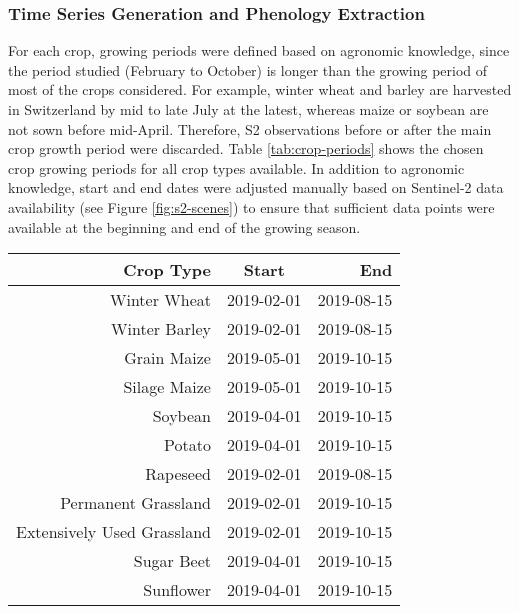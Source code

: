 \subsubsection{Time Series Generation and Phenology Extraction}
\label{subsubsec:time-series}

For each crop, growing periods were defined based on agronomic knowledge, since the period studied (February to October) is longer than the growing period of most of the crops considered. For example, winter wheat and barley are harvested in Switzerland by mid to late July at the latest, whereas maize or soybean are not sown before mid-April. Therefore, \gls{S2} observations before or after the main crop growth period were discarded. Table \ref{tab:crop-periods} shows the chosen crop growing periods for all crop types available. In addition to agronomic knowledge, start and end dates were adjusted manually based on Sentinel-2 data availability (see Figure \ref{fig:s2-scenes}) to ensure that sufficient data points were available at the beginning and end of the growing season.

\begin{table*}
\centering
\caption{Key crop growth periods defined based on agronomic knowledge to constrain the temporal range considered per crop type between a start and end date (YYYY-MM-DD).}
\begin{tabular*}{\textwidth}{@{\extracolsep{\fill}}rcr}
\bottomrule
Crop Type                     & Start      & End        \\
\hline
Winter Wheat              & 2019-02-01 & 2019-08-15 \\
Winter Barley             & 2019-02-01 & 2019-08-15 \\
Grain Maize               & 2019-05-01 & 2019-10-15 \\
Silage Maize              & 2019-05-01 & 2019-10-15 \\
Soybean                   & 2019-04-01 & 2019-10-15 \\
Potato                    & 2019-04-01 & 2019-10-15 \\
Rapeseed                  & 2019-02-01 & 2019-08-15 \\
Permanent Grassland        & 2019-02-01 & 2019-10-15 \\
Extensively Used Grassland & 2019-02-01 & 2019-10-15 \\
Sugar Beet                & 2019-04-01 & 2019-10-15 \\
Sunflower                 & 2019-04-01 & 2019-10-15 \\
\hline
\end{tabular*}
\label{tab:crop-periods}
\end{table*}

